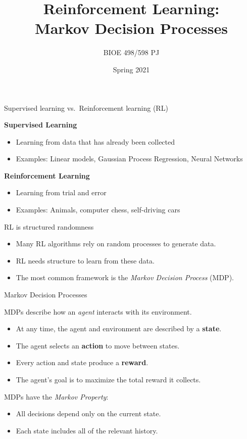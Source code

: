 \documentclass[9pt]{beamer}
\title{Reinforcement Learning:\\Markov Decision Processes}
\author{BIOE 498/598 PJ}
\date{Spring 2021}
\newcommand\pskip{\pause\bigskip}
\newcommand\lspace{\addtolength{\itemsep}{0.5\baselineskip}}
\begin{document}
\frame{\titlepage}

\begin{frame}{Supervised learning vs.\ Reinforcement learning (RL)}

\textbf{Supervised Learning}
\begin{itemize}
	\item Learning from data that has already been collected
	\item Examples: Linear models, Gaussian Process Regression, Neural Networks
\end{itemize}

\pskip
\textbf{Reinforcement Learning}
\begin{itemize}
	\item Learning from trial and error
	\item Examples: Animals, computer chess, self-driving cars
\end{itemize}
	
\end{frame}

\begin{frame}{RL is structured randomness}

\begin{itemize}\lspace
	\item Many RL algorithms rely on random processes to generate data.
	\item RL needs structure to learn from these data.
	\item The most common framework is the \emph{Markov Decision Process} (MDP).
\end{itemize}	

\end{frame}

\begin{frame}{Markov Decision Processes}
	
MDPs describe how an \emph{agent} interacts with its environment.
\bigskip
\begin{itemize}\lspace
	\item At any time, the agent and environment are described by a \textbf{state}.
	\item The agent selects an \textbf{action} to move between states.
	\item Every action and state produce a \textbf{reward}.
	\item The agent's goal is to maximize the total reward it collects.
\end{itemize}

\pskip
MDPs have the \emph{Markov Property}:
\begin{itemize}
	\item All decisions depend only on the current state.
	\item Each state includes all of the relevant history.
\end{itemize}

\end{frame}
\end{document}
